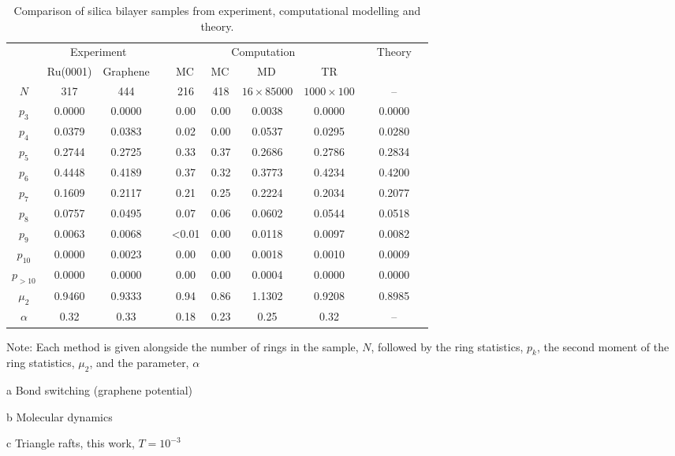 \begin{landscape}
\begin{table}
\centering
\caption{Comparison of silica bilayer samples from experiment, computational modelling and theory.}
\label{tab:trpk}
\begin{threeparttable}
\begin{tabular}{@{}ccccccccccc@{}}
\toprule
& \multicolumn{2}{c}{Experiment} & \phantom{xxx} & \multicolumn{4}{c}{Computation} & \phantom{xxx} & \multicolumn{1}{c}{Theory} \\ 
\cmidrule{2-3} \cmidrule{5-8} \cmidrule{10-10}
& Ru(0001) \cite{Buchner2016a} & Graphene \cite{Huang2012} & & MC\tnote{a}\, \cite{Kumar2014} & MC\tnote{a}\, \cite{Kumar2014} & MD\tnote{b}\, \cite{Roy2018} & TR\tnote{c} & & \lm{} \cite{Gervois1992}  \\ 
\midrule
$N$ & 317    & 444    &&    216 & 418      & $16 \times 85000$ & $1000 \times 100$ && \--- \\ 
$p_3$  &0.0000 & 0.0000 && 0.00 & 0.00     & 0.0038            & 0.0000 && 0.0000 \\ 
$p_4$  &0.0379 & 0.0383 && 0.02   & 0.00     & 0.0537            & 0.0295 && 0.0280 \\  
$p_5$  &0.2744 & 0.2725 && 0.33   & 0.37     & 0.2686            & 0.2786 && 0.2834 \\
$p_6$  &0.4448 & 0.4189 && 0.37   & 0.32     & 0.3773            & 0.4234 &&  0.4200 \\  
$p_7$  &0.1609 & 0.2117 && 0.21   & 0.25     & 0.2224            & 0.2034 && 0.2077 \\  
$p_8$  &0.0757 & 0.0495 && 0.07   & 0.06     & 0.0602            & 0.0544 && 0.0518 \\ 
$p_9$  &0.0063 & 0.0068 && <0.01  & 0.00     & 0.0118            & 0.0097 && 0.0082 \\
$p_{10}$  &0.0000 & 0.0023 && 0.00 & 0.00  & 0.0018            & 0.0010 && 0.0009 \\
$p_{>10}$  &0.0000 & 0.0000 && 0.00 & 0.00 & 0.0004            & 0.0000 && 0.0000 \\ 
$\mu_2$ &  0.9460 & 0.9333 &&  0.94 & 0.86 & 1.1302 & 0.9208 && 0.8985 \\ 
$\alpha$  &0.32   & 0.33 && 0.18 & 0.23 & 0.25 & 0.32 && \--- \\
\bottomrule
\end{tabular}
\begin{tablenotes}
  Note: Each method is given alongside the number of rings in the sample, $N$, followed by the ring statistics, $p_k$, the second moment of the ring statistics, $\mu_2$, and the \aw{} parameter, $\alpha$ \\
  \item[a] Bond switching \mc{} (graphene potential)
  \item[b] Molecular dynamics
  \item[c] Triangle rafts, this work, $T=10^{-3}$
\end{tablenotes}
\end{threeparttable}
\end{table}
\end{landscape}

